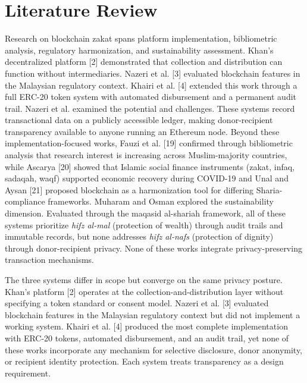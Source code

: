 \documentclass[conference]{IEEEtran}
\begin{document}
\section{Literature Review}

Research on blockchain zakat spans platform implementation, bibliometric analysis, regulatory harmonization, and sustainability assessment. Khan's decentralized platform [2] demonstrated that collection and distribution can function without intermediaries. Nazeri et al. [3] evaluated blockchain features in the Malaysian regulatory context. Khairi et al. [4] extended this work through a full ERC-20 token system with automated disbursement and a permanent audit trail. Nazeri et al. \cite{b_zakat_emerald} examined the potential and challenges. These systems record transactional data on a publicly accessible ledger, making donor-recipient transparency available to anyone running an Ethereum node. Beyond these implementation-focused works, Fauzi et al. [19] confirmed through bibliometric analysis that research interest is increasing across Muslim-majority countries, while Ascarya [20] showed that Islamic social finance instruments (zakat, infaq, sadaqah, waqf) supported economic recovery during COVID-19 and Unal and Aysan [21] proposed blockchain as a harmonization tool for differing Sharia-compliance frameworks. Muharam and Osman \cite{b_isf_blockchain} explored the sustainability dimension. Evaluated through the maqasid al-shariah framework, all of these systems prioritize \textit{hifz al-mal} (protection of wealth) through audit trails and immutable records, but none addresses \textit{hifz al-nafs} (protection of dignity) through donor-recipient privacy. None of these works integrate privacy-preserving transaction mechanisms.

The three systems differ in scope but converge on the same privacy posture. Khan's platform [2] operates at the collection-and-distribution layer without specifying a token standard or consent model. Nazeri et al. [3] evaluated blockchain features in the Malaysian regulatory context but did not implement a working system. Khairi et al. [4] produced the most complete implementation with ERC-20 tokens, automated disbursement, and an audit trail, yet none of these works incorporate any mechanism for selective disclosure, donor anonymity, or recipient identity protection. Each system treats transparency as a design requirement.
\end{document}
